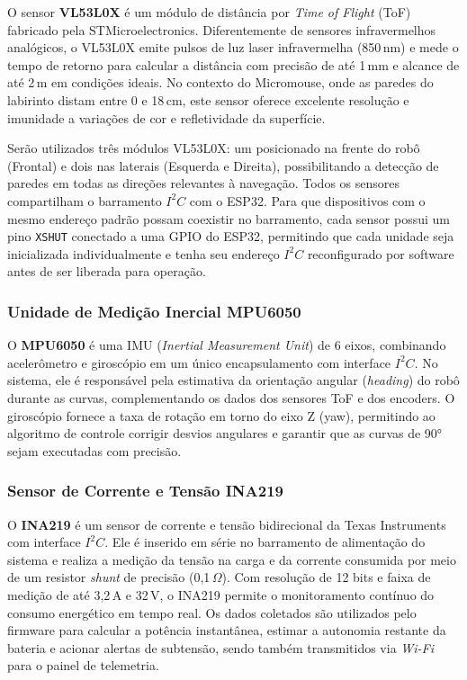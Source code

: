 O sensor \textbf{VL53L0X} é um módulo de distância por \textit{Time of Flight} (ToF) fabricado
pela STMicroelectronics. Diferentemente de sensores infravermelhos analógicos, o VL53L0X emite
pulsos de luz laser infravermelha (850\,nm) e mede o tempo de retorno para calcular a distância
com precisão de até 1\,mm e alcance de até 2\,m em condições ideais. No contexto do Micromouse,
onde as paredes do labirinto distam entre 0 e 18\,cm, este sensor oferece excelente resolução
e imunidade a variações de cor e refletividade da superfície.

Serão utilizados três módulos VL53L0X: um posicionado na frente do robô (Frontal) e
dois nas laterais (Esquerda e Direita), possibilitando a detecção de paredes em todas as
direções relevantes à navegação. Todos os sensores compartilham o barramento $I^2C$ com o
ESP32. Para que dispositivos com o mesmo endereço padrão possam coexistir no barramento, cada
sensor possui um pino \texttt{XSHUT} conectado a uma GPIO do ESP32, permitindo que cada
unidade seja inicializada individualmente e tenha seu endereço $I^2C$ reconfigurado por
software antes de ser liberada para operação.

\subsubsection{Unidade de Medição Inercial MPU6050}

O \textbf{MPU6050} é uma IMU (\textit{Inertial Measurement Unit}) de 6 eixos, combinando
acelerômetro e giroscópio em um único encapsulamento com interface $I^2C$. No sistema, ele é
responsável pela estimativa da orientação angular (\textit{heading}) do robô durante as curvas,
complementando os dados dos sensores ToF e dos encoders. O giroscópio fornece a taxa de rotação
em torno do eixo Z (yaw), permitindo ao algoritmo de controle corrigir desvios angulares e
garantir que as curvas de 90° sejam executadas com precisão.

\subsubsection{Sensor de Corrente e Tensão INA219}

O \textbf{INA219} é um sensor de corrente e tensão bidirecional da Texas Instruments com
interface $I^2C$. Ele é inserido em série no barramento de alimentação do sistema e realiza a
medição da tensão na carga e da corrente consumida por meio de um resistor \textit{shunt} de
precisão (0,1\,$\Omega$). Com resolução de 12 bits e faixa de medição de até 3,2\,A e 32\,V,
o INA219 permite o monitoramento contínuo do consumo energético em tempo real. Os dados
coletados são utilizados pelo firmware para calcular a potência instantânea, estimar a
autonomia restante da bateria e acionar alertas de subtensão, sendo também transmitidos via
\textit{Wi-Fi} para o painel de telemetria.

